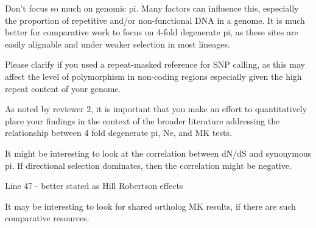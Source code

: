 
\begin{point}{} %
Don't focus so much on genomic pi. Many factors can influence this,
especially the proportion of repetitive and/or non-functional DNA in a
genome. It is much better for comparative work to focus on 4-fold
degenerate pi, as these sites are easily alignable and under weaker
selection in most lineages.
\end{point}


\begin{point}{} %
Please clarify if you used a repeat-masked reference for SNP calling, as
this may affect the level of polymorphism in non-coding regions
especially given the high repeat content of your genome.
\end{point}


\begin{point}{} %
As noted by reviewer 2, it is important that you make an effort to
quantitatively place your findings in the context of the broader
literature addressing the relationship between 4 fold degenerate pi, Ne,
and MK tests.
\end{point}


\begin{point}{} %
It might be interesting to look at the correlation between dN/dS and
synonymous pi. If directional selection dominates, then the correlation
might be negative.
\end{point}


\begin{point}{} %
Line 47 - better stated as Hill Robertson effects
\end{point}


\begin{point}{} %
It may be interesting to look for shared ortholog MK results, if there
are such comparative resources.
\end{point}


